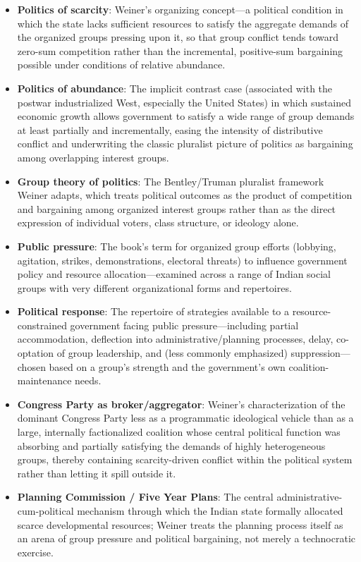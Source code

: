 \documentclass[12pt]{article}
\begin{document}
\begin{itemize}[leftmargin=*, itemsep=4pt]
    \item \textbf{Politics of scarcity}: Weiner's organizing concept---a political condition in which the state lacks sufficient resources to satisfy the aggregate demands of the organized groups pressing upon it, so that group conflict tends toward zero-sum competition rather than the incremental, positive-sum bargaining possible under conditions of relative abundance.
    \item \textbf{Politics of abundance}: The implicit contrast case (associated with the postwar industrialized West, especially the United States) in which sustained economic growth allows government to satisfy a wide range of group demands at least partially and incrementally, easing the intensity of distributive conflict and underwriting the classic pluralist picture of politics as bargaining among overlapping interest groups.
    \item \textbf{Group theory of politics}: The Bentley/Truman pluralist framework Weiner adapts, which treats political outcomes as the product of competition and bargaining among organized interest groups rather than as the direct expression of individual voters, class structure, or ideology alone.
    \item \textbf{Public pressure}: The book's term for organized group efforts (lobbying, agitation, strikes, demonstrations, electoral threats) to influence government policy and resource allocation---examined across a range of Indian social groups with very different organizational forms and repertoires.
    \item \textbf{Political response}: The repertoire of strategies available to a resource-constrained government facing public pressure---including partial accommodation, deflection into administrative/planning processes, delay, co-optation of group leadership, and (less commonly emphasized) suppression---chosen based on a group's strength and the government's own coalition-maintenance needs.
    \item \textbf{Congress Party as broker/aggregator}: Weiner's characterization of the dominant Congress Party less as a programmatic ideological vehicle than as a large, internally factionalized coalition whose central political function was absorbing and partially satisfying the demands of highly heterogeneous groups, thereby containing scarcity-driven conflict within the political system rather than letting it spill outside it.
    \item \textbf{Planning Commission / Five Year Plans}: The central administrative-cum-political mechanism through which the Indian state formally allocated scarce developmental resources; Weiner treats the planning process itself as an arena of group pressure and political bargaining, not merely a technocratic exercise.

\end{itemize}
\end{document}
